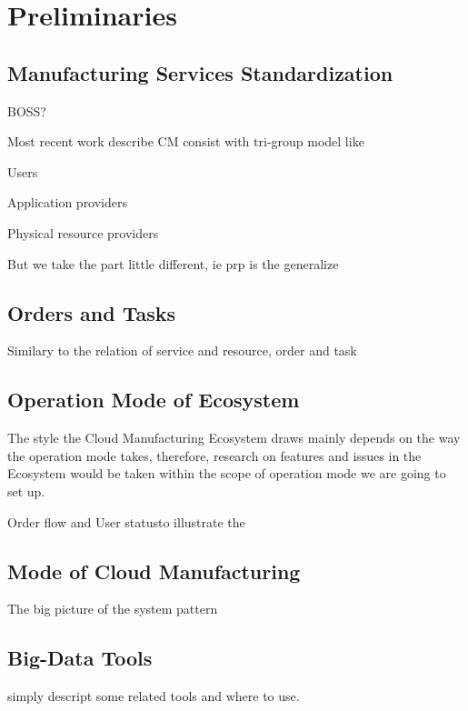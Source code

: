 \section{Preliminaries} %
\subsection{Manufacturing Services Standardization}

BOSS?


Most recent work describe CM consist with tri-group model like \begin{inparaenum}[1)]
\item Users
\item Application providers
\item Physical resource providers
\end{inparaenum}

But we take the part little different, ie prp is the generalize

\subsection{Orders and Tasks}
Similary to the relation of service and resource, order and task 

\subsection{Operation Mode of Ecosystem}
The style the Cloud Manufacturing Ecosystem draws mainly depends on the way the operation mode takes, therefore, research on features and issues in the Ecosystem would be taken within the scope of operation mode we are going to set up.  

Order flow and User statusto illustrate the 

\subsection{Mode of Cloud Manufacturing}
The big picture of the system pattern

\subsection{Big-Data Tools}
simply descript some related tools and where to use.
